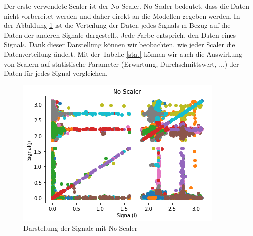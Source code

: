 \documentclass[12pt,a4paper]{scrartcl}
\numberwithin{equation}{section}
\begin{document}
Der erste verwendete Scaler ist der No Scaler. No Scaler bedeutet, dass die Daten nicht vorbereitet werden und daher direkt an die Modellen gegeben werden. In der Abbildung \ref{noScaler} ist die Verteilung der Daten jedes Signals in Bezug auf die Daten der anderen Signale dargestellt. Jede Farbe entspricht den Daten eines Signals. Dank dieser Darstellung können wir beobachten, wie jeder Scaler die Datenverteilung ändert. Mit der Tabelle \ref{stat} können wir auch die Auswirkung von Scalern auf statistische Parameter (Erwartung, Durchschnittswert, ...) der Daten für jedes Signal vergleichen. 

\begin{figure}[ht!]
	\centering
	  \includegraphics[scale=0.5]{noScaler.png}
	  \caption{Darstellung der Signale mit No Scaler}
	\label{noScaler}
\end{figure}

 \begin{table}[ht!]
    \caption{Statistische Werte für jeden Sensor mit No Scaler}
    \label{stat}          
\end{table}
\end{document}
